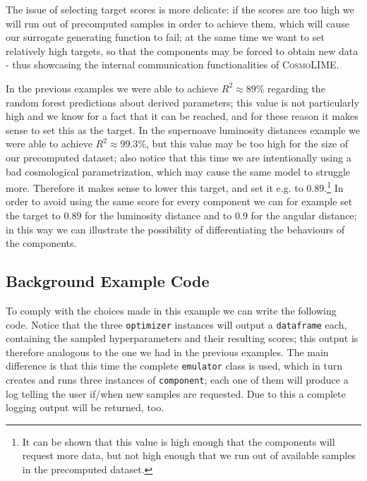 The issue of selecting target scores is more delicate: if the scores are too high we will run out of precomputed samples in order to achieve them, which will cause our surrogate generating function to fail; at the same time we want to set relatively high targets, so that the components may be forced to obtain new data - thus showcasing the internal communication functionalities of \textsc{CosmoLIME}.

In the previous examples we were able to achieve $R^2\approx 89\%$ regarding the random forest predictions about derived parameters; this value is not particularly high and we know for a fact that it can be reached, and for these reason it makes sense to set this as the target.
In the supernoave luminosity distances example we were able to achieve $R^2\approx 99.3\%$, but this value may be too high for the size of our precomputed dataset; also notice that this time we are intentionally using a bad cosmological parametrization, which may cause the same model to struggle more. Therefore it makes sense to lower this target, and set it e.g. to $0.89$.\footnote{It can be shown that this value is high enough that the components will request more data, but not high enough that we run out of available samples in the precomputed dataset.} 
In order to avoid using the same score for every component we can for example set the target to $0.89$ for the luminosity distance and to $0.9$ for the angular distance; in this way we can illustrate the possibility of differentiating the behaviours of the components.

\subsection{Background Example Code}
To comply with the choices made in this example we can write the following code. Notice that the three \texttt{optimizer} instances will output a \texttt{dataframe} each, containing the sampled hyperparameters and their resulting scores; this output is therefore analogous to the one we had in the previous examples.
The main difference is that this time the complete \texttt{emulator} class is used, which in turn creates and runs three instances of \texttt{component}; each one of them will produce a log telling the user if/when new samples are requested. Due to this a complete logging output will be returned, too.




